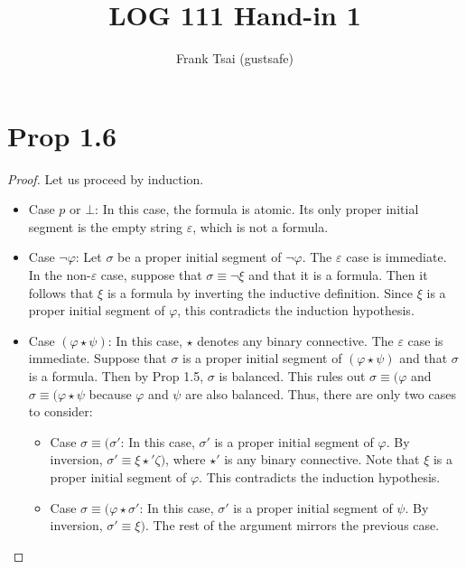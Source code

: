 \documentclass[a4paper]{article}
\title{LOG 111 Hand-in 1}
\author{Frank Tsai (gustsafe)}
\begin{document}
\maketitle

\section{Prop 1.6}
\begin{proof}
  Let us proceed by induction.
  \begin{itemize}
  \item Case $p$ or $\bot$: In this case, the formula is atomic.
    Its only proper initial segment is the empty string $\varepsilon$, which is not a formula.

  \item Case $\lnot\varphi$: Let $\sigma$ be a proper initial segment of $\lnot\varphi$.
    The $\varepsilon$ case is immediate.
    In the non-$\varepsilon$ case, suppose that $\sigma \equiv \lnot\xi$ and that it is a formula.
    Then it follows that $\xi$ is a formula by inverting the inductive definition.
    Since $\xi$ is a proper initial segment of $\varphi$, this contradicts the induction hypothesis.

  \item Case $(\varphi \star \psi)$: In this case, $\star$ denotes any binary connective.
    The $\varepsilon$ case is immediate.
    Suppose that $\sigma$ is a proper initial segment of $(\varphi \star \psi)$ and that $\sigma$ is a formula.
    Then by Prop 1.5, $\sigma$ is balanced.
    This rules out $\sigma \equiv (\varphi$ and $\sigma \equiv (\varphi \star \psi$ because $\varphi$ and $\psi$ are also balanced.
    Thus, there are only two cases to consider:
    \begin{itemize}
    \item Case $\sigma \equiv (\sigma'$: In this case, $\sigma'$ is a proper initial segment of $\varphi$.
      By inversion, $\sigma' \equiv \xi \star' \zeta)$, where $\star'$ is any binary connective.
      Note that $\xi$ is a proper initial segment of $\varphi$.
      This contradicts the induction hypothesis.
    \item Case $\sigma \equiv (\varphi \star \sigma'$: In this case, $\sigma'$ is a proper initial segment of $\psi$.
      By inversion, $\sigma' \equiv \xi)$.
      The rest of the argument mirrors the previous case. \qedhere
    \end{itemize}
  \end{itemize}
\end{proof}
\end{document}
